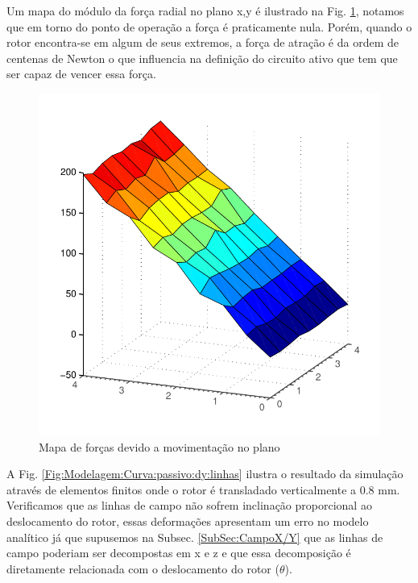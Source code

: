 Um mapa do módulo da força radial no plano x,y é ilustrado na Fig. \ref{fig:passivo_otimizado_fem_plano}, notamos que em torno do ponto de operação a força é praticamente nula. Porém, quando o rotor encontra-se em algum de seus extremos, a força de atração é da ordem de centenas de Newton o que influencia na definição do circuito ativo que tem que ser capaz de vencer essa força.

\begin{figure}[!ht]
\centering
\includegraphics[width=0.7\linewidth]{Figs/Simulacoes/Passivo2/passivo_otimizado_fem_plano}
\caption{Mapa de forças devido a movimentação no plano}
\label{fig:passivo_otimizado_fem_plano}
\end{figure} 


A Fig. \ref{Fig:Modelagem:Curva:passivo:dy:linhas} ilustra o resultado da simulação através de elementos finitos onde o rotor é transladado verticalmente a 0.8 mm. Verificamos que as linhas de campo não sofrem inclinação proporcional ao deslocamento do rotor, essas deformações apresentam um erro no modelo analítico já que supusemos na Subsec. \ref{SubSec:CampoX/Y} que as linhas de campo poderiam ser decompostas em x e z e que essa decomposição é diretamente relacionada com o deslocamento do rotor ($\theta$). 

